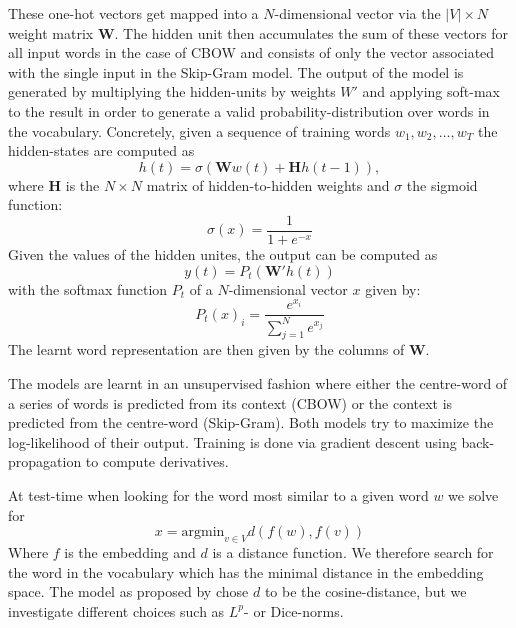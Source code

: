 \documentclass[conference]{IEEEtran}
\begin{document}
These one-hot vectors get mapped into a $N$-dimensional vector via the $|V| \times N$ weight matrix
$\boldsymbol{W}$.  The hidden unit then accumulates the sum of these vectors for all input
words in the case of CBOW and consists of only the vector associated with the single input in the 
Skip-Gram model. The output of the model is generated by multiplying the hidden-units by
weights $W'$ and applying soft-max to the result in order to generate a valid
probability-distribution over words in the vocabulary. Concretely, given a sequence of 
training words $w_1, w_2, \dots , w_T$ the hidden-states are computed as
\begin{equation}
	h(t) = \sigma (\boldsymbol{W}w(t) + \boldsymbol{H}h(t-1)),
\end{equation}
where $\boldsymbol{H}$ is the $N \times N$ matrix of hidden-to-hidden weights and 
$\sigma$ the sigmoid function:  
\begin{equation}
	\sigma (x) = \frac{1}{1+e^{-x}} 
\end{equation}
Given the values of the hidden unites, the output can be computed as 
\begin{equation}
	y(t) = P_t(\boldsymbol{W'}h(t))
\end{equation}
with the softmax function $P_t$ of a $N$-dimensional vector $x$ given by: 
\begin{equation}
	P_t(x)_i = \frac{e^{x_i}}{\sum_{j=1}^{N}{e^{x_j}}}
\end{equation}
The learnt word representation are then given by the columns of $\boldsymbol{W}$.

The models are learnt in an unsupervised fashion where either the centre-word of
a series of words is predicted from its context (CBOW) or the context is
predicted from the centre-word (Skip-Gram). Both models try to maximize the
log-likelihood of their output. Training is done via gradient descent using back-propagation
\cite{rumelhart1988learning} to compute derivatives.

At test-time when looking for the word most similar to a given word $w$ we solve for 
\begin{equation}
	x = \text{argmin}_{v \in V} d(f(w),f(v))
\end{equation}
Where $f$ is the embedding and $d$ is a distance function. We therefore search for the 
word in the vocabulary which has the minimal distance in the embedding space. The 
model as proposed by \cite{mikolov2013efficient} chose $d$ to be the cosine-distance, 
but we investigate different choices such as $L^p$- or Dice-norms.
\end{document}
